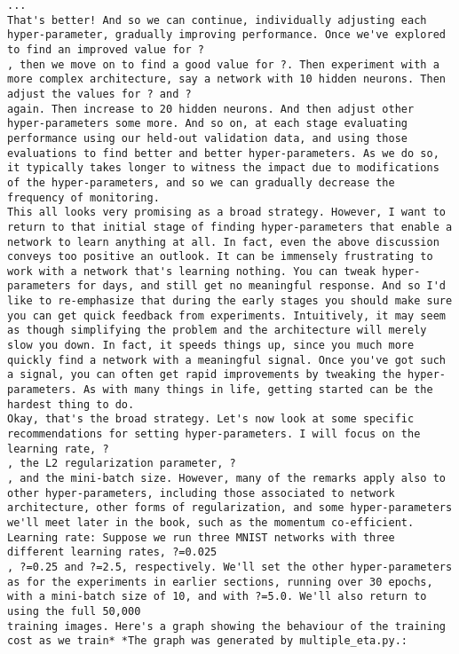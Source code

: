 \begin{lstlisting}
...
That's better! And so we can continue, individually adjusting each hyper-parameter, gradually improving performance. Once we've explored to find an improved value for ?
, then we move on to find a good value for ?. Then experiment with a more complex architecture, say a network with 10 hidden neurons. Then adjust the values for ? and ?
again. Then increase to 20 hidden neurons. And then adjust other hyper-parameters some more. And so on, at each stage evaluating performance using our held-out validation data, and using those evaluations to find better and better hyper-parameters. As we do so, it typically takes longer to witness the impact due to modifications of the hyper-parameters, and so we can gradually decrease the frequency of monitoring.
This all looks very promising as a broad strategy. However, I want to return to that initial stage of finding hyper-parameters that enable a network to learn anything at all. In fact, even the above discussion conveys too positive an outlook. It can be immensely frustrating to work with a network that's learning nothing. You can tweak hyper-parameters for days, and still get no meaningful response. And so I'd like to re-emphasize that during the early stages you should make sure you can get quick feedback from experiments. Intuitively, it may seem as though simplifying the problem and the architecture will merely slow you down. In fact, it speeds things up, since you much more quickly find a network with a meaningful signal. Once you've got such a signal, you can often get rapid improvements by tweaking the hyper-parameters. As with many things in life, getting started can be the hardest thing to do.
Okay, that's the broad strategy. Let's now look at some specific recommendations for setting hyper-parameters. I will focus on the learning rate, ?
, the L2 regularization parameter, ?
, and the mini-batch size. However, many of the remarks apply also to other hyper-parameters, including those associated to network architecture, other forms of regularization, and some hyper-parameters we'll meet later in the book, such as the momentum co-efficient.
Learning rate: Suppose we run three MNIST networks with three different learning rates, ?=0.025
, ?=0.25 and ?=2.5, respectively. We'll set the other hyper-parameters as for the experiments in earlier sections, running over 30 epochs, with a mini-batch size of 10, and with ?=5.0. We'll also return to using the full 50,000
training images. Here's a graph showing the behaviour of the training cost as we train* *The graph was generated by multiple_eta.py.:


\end{lstlisting}
